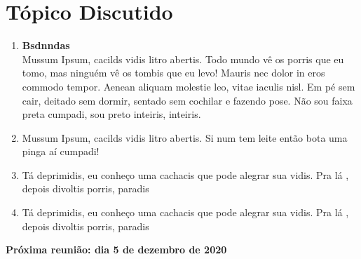 \documentclass[12pt, letterpaper]{article}
\newcommand{\nextmeeting}[1]{
  \begin{center}
    \Large{\vspace*{\fill}\textbf{#1}}
  \end{center}
}
\begin{document}
  \section*{Tópico Discutido}

  \begin{enumerate}[\indent {}]
      \item \textbf{Bsdnndas} \\ Mussum Ipsum, cacilds vidis litro abertis. Todo mundo vê os porris que eu tomo, mas ninguém vê os tombis que eu levo! Mauris nec dolor in eros commodo tempor. Aenean aliquam molestie leo, vitae iaculis nisl. Em pé sem cair, deitado sem dormir, sentado sem cochilar e fazendo pose. Não sou faixa preta cumpadi, sou preto inteiris, inteiris.
    \item Mussum Ipsum, cacilds vidis litro abertis. Si num tem leite então bota uma pinga aí cumpadi!
    \item Tá deprimidis, eu conheço uma cachacis que pode alegrar sua vidis. Pra lá , depois divoltis porris, paradis
    \item Tá deprimidis, eu conheço uma cachacis que pode alegrar sua vidis. Pra lá , depois divoltis porris, paradis
  \end{enumerate}

  \nextmeeting{Próxima reunião: dia 5 de dezembro de 2020}



\end{document}
